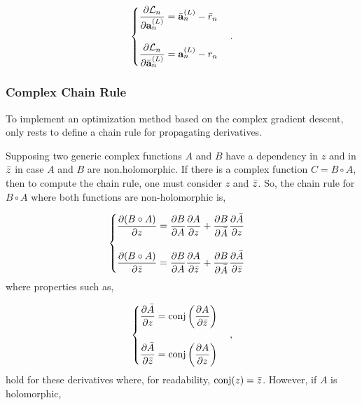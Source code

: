 \begin{equation}
	\begin{cases}
		\dfrac{\partial \mathcal{L}_n}{\partial \mathbf{a}^{(L)}_{n}} = \bar{\mathbf{a}}^{(L)}_{n} - \bar{r}_n \\
		\\
		\dfrac{\partial \mathcal{L}_n}{\partial \bar{\mathbf{a}}^{(L)}_{n}} = \mathbf{a}^{(L)}_{n} - r_n
	\end{cases}.
\end{equation}

\subsubsection{Complex Chain Rule}
To implement an optimization method based on the complex gradient descent, only rests to define a chain rule for propagating derivatives. 

Supposing two generic complex functions $ A $ and $ B $ have a dependency in $ z $ and in $ \bar{z} $ in case $ A $ and $ B $ are non.holomorphic. If there is a complex function $ C = B \circ A $, then to compute the chain rule, one must consider $ z $ and $ \bar{z} $. So, the chain rule for $ B \circ A $ where both functions are non-holomorphic is,

\begin{equation}
	\begin{cases}
		\dfrac{\partial (B \circ A)}{\partial z} = \dfrac{\partial B}{\partial A}\dfrac{\partial A}{\partial z} + \dfrac{\partial B}{\partial \bar{A}}\dfrac{\partial \bar{A}}{\partial z} \\
		\\
		\dfrac{\partial (B \circ A)}{\partial \bar{z}} = \dfrac{\partial B}{\partial A}\dfrac{\partial A}{\partial \bar{z}} + \dfrac{\partial B}{\partial \bar{A}}\dfrac{\partial \bar{A}}{\partial \bar{z}} \\
	\end{cases}
	\label{eq:AB_nonholo}
\end{equation}
where properties such as,

\begin{equation}
	\begin{cases}
		\dfrac{\partial \bar{A}}{\partial z} = \text{conj}\left( \dfrac{\partial A}{\partial \bar{z}} \right) \\
		\\
		\dfrac{\partial \bar{A}}{\partial \bar{z}} = \text{conj}\left( \dfrac{\partial A}{\partial z} \right)
	\end{cases},
	\label{eq:comp_conj_div}
\end{equation}
hold for these derivatives where, for readability, $ \text{conj}(z) = \bar{z} $. However, if $ A $ is holomorphic,

